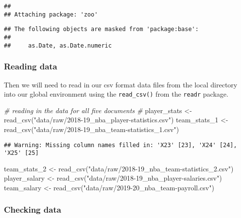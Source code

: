 \documentclass[
]{article}
\newenvironment{Shaded}{\begin{snugshade}}{\end{snugshade}}
\newcommand{\CommentTok}[1]{\textcolor[rgb]{0.56,0.35,0.01}{\textit{#1}}}
\newcommand{\FunctionTok}[1]{\textcolor[rgb]{0.00,0.00,0.00}{#1}}
\newcommand{\NormalTok}[1]{#1}
\newcommand{\OtherTok}[1]{\textcolor[rgb]{0.56,0.35,0.01}{#1}}
\newcommand{\StringTok}[1]{\textcolor[rgb]{0.31,0.60,0.02}{#1}}
\begin{document}
\begin{verbatim}
## 
## Attaching package: 'zoo'
\end{verbatim}

\begin{verbatim}
## The following objects are masked from 'package:base':
## 
##     as.Date, as.Date.numeric
\end{verbatim}

\hypertarget{reading-data}{%
\subsubsection{Reading data}\label{reading-data}}

Then we will need to read in our csv format data files from the local
directory into our global environment using the \texttt{read\_csv()}
from the \texttt{readr} package.

\begin{Shaded}
\begin{Highlighting}[]
\CommentTok{\# reading in the data for all five documents \#}
\NormalTok{player\_stats }\OtherTok{\textless{}{-}} \FunctionTok{read\_csv}\NormalTok{(}\StringTok{"data/raw/2018{-}19\_nba\_player{-}statistics.csv"}\NormalTok{)}
\NormalTok{team\_stats\_1 }\OtherTok{\textless{}{-}} \FunctionTok{read\_csv}\NormalTok{(}\StringTok{"data/raw/2018{-}19\_nba\_team{-}statistics\_1.csv"}\NormalTok{)}
\end{Highlighting}
\end{Shaded}

\begin{verbatim}
## Warning: Missing column names filled in: 'X23' [23], 'X24' [24], 'X25' [25]
\end{verbatim}

\begin{Shaded}
\begin{Highlighting}[]
\NormalTok{team\_stats\_2 }\OtherTok{\textless{}{-}} \FunctionTok{read\_csv}\NormalTok{(}\StringTok{"data/raw/2018{-}19\_nba\_team{-}statistics\_2.csv"}\NormalTok{)}
\NormalTok{player\_salary }\OtherTok{\textless{}{-}} \FunctionTok{read\_csv}\NormalTok{(}\StringTok{"data/raw/2018{-}19\_nba\_player{-}salaries.csv"}\NormalTok{)}
\NormalTok{team\_salary }\OtherTok{\textless{}{-}} \FunctionTok{read\_csv}\NormalTok{(}\StringTok{"data/raw/2019{-}20\_nba\_team{-}payroll.csv"}\NormalTok{)}
\end{Highlighting}
\end{Shaded}

\hypertarget{checking-data}{%
\subsubsection{Checking data}\label{checking-data}}
\end{document}
